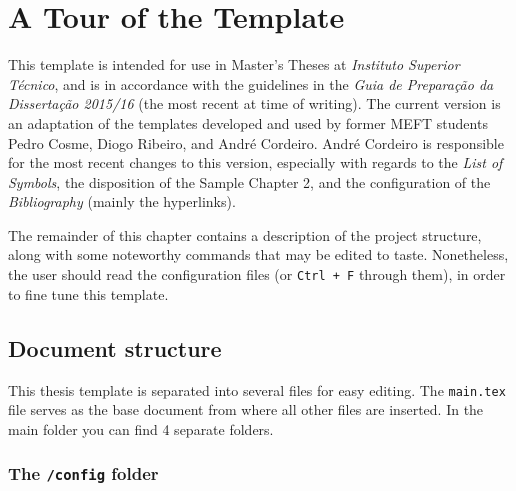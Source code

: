 \chapter{A Tour of the Template}
\label{chapter:template_tour}


This template is intended for use in Master's Theses at \textit{Instituto Superior Técnico}, and is in accordance with the guidelines in the \textit{Guia de Preparação da Dissertação 2015/16} (the most recent at time of writing). The current version is an adaptation of the templates developed and used by former MEFT students Pedro Cosme, Diogo Ribeiro, and André Cordeiro. André Cordeiro is responsible for the most recent changes to this version, especially with regards to the \textit{List of Symbols}, the disposition of the Sample Chapter 2, and the configuration of the \textit{Bibliography} (mainly the hyperlinks).

The remainder of this chapter contains a description of the project structure, along with some noteworthy commands that may be edited to taste. Nonetheless, the user should read the configuration files (or \texttt{Ctrl + F} through them), in order to fine tune this template.


\section{Document structure}

This thesis template is separated into several files for easy editing. The \texttt{main.tex} file serves as the base document from where all other files are inserted. In the main folder you can find 4 separate folders.

\subsection{The {\normalfont\texttt{/config}} folder} %

